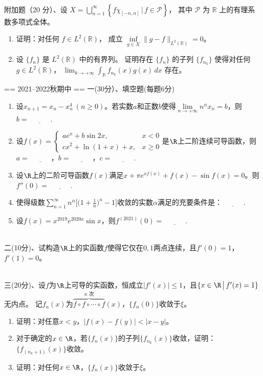 ~\\
附加题（20 分）、设 $X=\bigcup\limits_{n=1}^{\infty}\left\{f \chi_{[-n,n]} \,\big|\, f \in \mathscr{P}\right\}$，
其中 $\mathscr{P}$ 为 $\mathbb{R}$ 上的有理系数多项式全体。
\begin{enumerate}[label=(\arabic*)]
\item 证明：对任何 $f \in L^{2}(\mathbb{R})$，
成立 $\inf\limits_{g \in X}\|g-f\|_{L^{2}(\mathbb{R})}=0$。
\item 设 $\{f_{n}\}$ 是 $L^{2}(\mathbb{R})$ 中的有界列。
证明存在 $\{f_{n}\}$ 的子列 $\{f_{n_{k}}\}$ 使得对任何 $g \in L^{2}(\mathbb{R})$，
$\displaystyle\lim_{k \rightarrow+\infty} \int_{\mathbb{R}} f_{n_{k}}(x)g(x) \, dx$ 存在。
\end{enumerate}

== 2021--2022秋期中 ==
一(30分）、填空题(每题6分)
\begin{enumerate}[label=(\arabic*)]
\item 设$x_{n+1}=x_n-x_n^4\ (n\ge0)$。若实数$a$和正数$b$使得$\lim\limits_{n\to+\infty}n^\alpha x_n=b$，则$b=\underline{\qquad\quad}$.\\
\item 设$f(x)=\begin{cases}ae^x+b\sin 2x,&x<0\\cx^2+\ln(1+x)+x,&x\ge0\end{cases}$是$\R$上二阶连续可导函数，则$a=\underline{\qquad\quad}$，$b=\underline{\qquad\quad}$，$c=\underline{\qquad\quad}$.\\
\item 设$\R$上的二阶可导函数$f(x)$满足$x+\pi e^{xf(x)}+f(x)-\sin f(x)=0$。则$f''(0)=\underline{\qquad\quad}$.\\
\item 使得级数$\displaystyle \sum\limits_{n=1}^{\infty} n^\alpha\Big[\Big(1+\frac{1}{n}\Big)^n-1\Big]$收敛的实数$\alpha$满足的充要条件是：$\underline{\qquad\quad}$.\\
\item 设$f(x)=x^{2019}e^{2020x}\sin x$，则$f^{(2021)}(0)=\underline{\qquad\quad}$.\\
\end{enumerate}
~\\
二(10分)、试构造$\R$上的实函数$f$使得它仅在$0,1$两点连续，且$f'(0)=1$，$f'(1)=0$。

~\\
三(20分)、设$f$为$\R$上可导的实函数，恒成立$|f'(x)|\le1$，且$\{x\in\R\,\big|\,f'(x)=1\}$无内点。
记$f_n(x)$为$\overbrace{f\circ f\circ \cdots\circ f}^{n\text{ 次}}(x)$，$\{f_n(0)\}$收敛于$\xi$。
\begin{enumerate}[label=(\arabic*)]
\item 证明：对任意$x<y$，$|f(x)-f(y)|<|x-y|$。
\item 对于确定的$x\in\R$，若$\{f_n(x)\}$的子列$\{f_{n_k}(x)\}$收敛，证明：$\{f_{(n_{k}+1)}(x)\}$收敛。
\item 证明：对任何$x\in\R$，$\{f_n(x)\}$收敛于$\xi$。
\end{enumerate}

